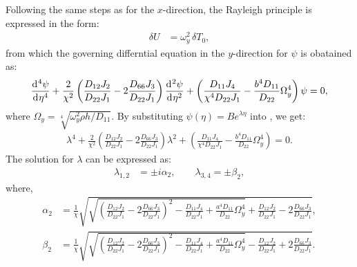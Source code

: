 \documentclass[preprint,12pt,number]{elsarticle}
\newcommand{\id}{\mathrm{d}\mkern1mu}
\begin{document}
Following the same steps as for the \(x\)-direction, the Rayleigh principle is expressed in the form:  
%
\begin{equation}\label{eq:Rayleighy}
	\begin{split}
		\delta U &= \omega_y^2 \, \delta T_0,
	\end{split}
\end{equation}
%
from which the governing differntial equation in the $y$-direction for $\psi$ is obatained as:
%
\begin{equation}\label{eq:ODEy}
	\frac{\id^4 \psi}{\id \eta^4} + \frac{2}{\chi^2}\left(\frac{D_{12}J_2}{D_{22}J_1} - 2\frac{D_{66}J_3}{D_{22}J_1}\right)\frac{\id^2 \psi}{\id \eta^2} + \left( \frac{D_{11}J_4}{\chi^4D_{22}J_1} - \frac{b^4D_{11}}{D_{22}} \Omega_y^4 \right) \psi = 0,
\end{equation}
%
where $\Omega_y = \sqrt[4]{{\omega_y^2 \rho h}/D_{11}}$.
By substituting $\psi(\eta) = B e^{\lambda \eta}$ into , we get:
%
\begin{equation}\label{eq:ODEy2}
\begin{split}
	\lambda^4 + \frac{2}{\chi^2} \left( \frac{D_{12}J_2}{D_{22}J_1} - 2\frac{D_{66}J_3}{D_{22}J_1} \right) \lambda^2 + \left( \frac{D_{11}J_4}{\chi^4D_{22}J_1} - \frac{b^4D_{11}}{D_{22}} \Omega_y^4 \right) = 0.
\end{split}
\end{equation}
%
The solution for $\lambda$ can be expressed as:
%
\begin{equation}\label{eq:lambda}
\begin{split}
	\lambda_{1,2} &= \pm \textit{i} \alpha_2, \qquad \lambda_{3,4} = \pm \beta_2,
\end{split}
\end{equation}
%
where,
%
\begin{subequations}\label{eq:beta}
\begin{align}
	\alpha_2 &= \frac{1}{\chi} \sqrt{ \sqrt{ \left( \frac{D_{12}J_2}{D_{22}J_1} - 2\frac{D_{66}J_3}{D_{22}J_1} \right)^2 - \frac{D_{11}J_4}{D_{22}J_1} + \frac{a^4 D_{11}}{D_{22}} \Omega_y^4 } + \frac{D_{12}J_2}{D_{22}J_1} - 2 \frac{D_{66}J_3}{D_{22}J_1}}, \label{eq:betay1}\\
	\beta_2 &= \frac{1}{\chi} \sqrt{ \sqrt{ \left( \frac{D_{12}J_2}{D_{22}J_1} - 2 \frac{D_{66}J_3}{D_{22}J_1} \right)^2 - \frac{D_{11}J_4}{D_{22}J_1} + \frac{a^4 D_{11}}{D_{22}} \Omega_y^4 } - \frac{D_{12}J_2}{D_{22}J_1} + 2 \frac{D_{66}J_3}{D_{22}J_1}}.\label{eq:betay2}
\end{align}
\end{subequations}
\end{document}
